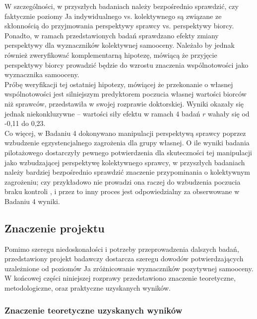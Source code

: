 \documentclass[man]{apa6}
\begin{document}
W szczególności, w przyszłych badaniach należy bezpośrednio sprawdzić, czy faktycznie poziomy Ja indywidualnego vs. kolektywnego są związane ze skłonnością do przyjmowania perspektywy sprawcy vs. perspektywy biorcy. Ponadto, w ramach przedstawionych badań sprawdzano efekty zmiany perspektywy dla wyznaczników kolektywnej samooceny. Należało by jednak również zweryfikować komplementarną hipotezę, mówiącą że przyjęcie perspektywy biorcy prowadzić będzie do wzrostu znaczenia wspólnotowości jako wyznacznika samooceny.\\

Próbę weryfikacji tej ostatniej hipotezy, mówiącej że przekonanie o własnej wspólnotowości jest silniejszym predyktorem poczucia własnej wartości biorców niż sprawców, przedstawiła \textcite{bialobrzeska2015perspektywy} w swojej rozprawie doktorskiej. Wyniki okazały się jednak niekonkluzywne -- wartości siły efektu w ramach 4 badań $r$ wahały się od -0,11 do 0,23. \\

Co więcej, w Badaniu 4 dokonywano manipulacji perspektywą sprawcy poprzez wzbudzenie egzystencjalnego zagrożenia dla grupy własnej. O ile wyniki badania pilotażowego dostarczyły pewnego potwierdzenia dla skuteczności tej manipulacji jako wzbudzającej perspektywę kolektywnego sprawcy, w przyszłych badaniach należy bardziej bezpośrednio sprawdzić znaczenie przypominania o kolektywnym zagrożeniu; czy przykładowo nie prowadzi ona raczej do wzbudzenia poczucia braku kontroli \parencite[patrz, ][]{sullivan2010existential}, i przez to inny proces jest odpowiedzialny za obserwowane w Badaniu 4 wyniki. \\

\subsection{Znaczenie projektu}

Pomimo szeregu niedoskonałości i potrzeby przeprowadzenia dalszych badań, przedstawiony projekt badawczy dostarcza szeregu dowodów potwierdzających uzależnione od poziomów Ja zróżnicowanie wyznaczników pozytywnej samooceny. W końcowej części niniejszej rozprawy przedstawiono znaczenie teoretyczne, metodologiczne, oraz praktyczne uzyskanych wyników.\\

\subsubsection{Znaczenie teoretyczne uzyskanych wyników}
\end{document}
